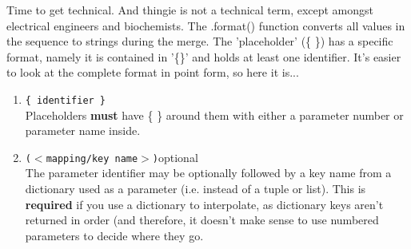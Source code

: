 Time to get technical. And thingie is not a technical term, except   amongst electrical engineers and biochemists. The .format() function converts      all values in the sequence to strings   during the merge. The 'placeholder' (\{ \}) has a specific format, namely it is contained in '\{\}'   and holds at least one identifier. It's easier to look at the complete format in point form, so here it is...
\begin{enumerate}
	\item 
\texttt{\{ identifier \}}
\\        Placeholders  \textbf{must} have \{ \} around them with        either a parameter number or parameter name inside.
	\item 
\texttt{($<$mapping/key name$>$)}\nolinebreak*optional
\\        The parameter identifier may be optionally followed by a key name from a dictionary    used as a parameter (i.e. instead of a tuple or list). This    is \textbf{required} if you use a dictionary to    interpolate, as dictionary keys aren't returned in order (and therefore,       it doesn't make sense to use numbered parameters to decide where they go. 
\begin{lstlisting}


\end{lstlisting}
\end{enumerate}
